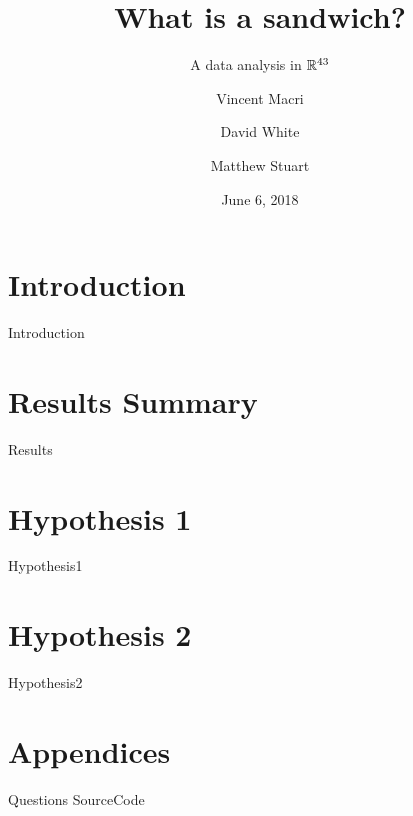 

\title{What is a sandwich?}
\subtitle{A data analysis in $\mathbb{R}^{43}$}
\author{Vincent Macri \and David White \and Matthew Stuart}
\date{June 6, 2018}


	\maketitle
	
	\tableofcontents
	\clearpage
	\part{Introduction}\label{part:introduction}
		{Introduction}
	\part{Results Summary}\label{part:results}
		{Results}
	\part{Hypothesis 1}\label{part:hypothesis1}
		{Hypothesis1}
	\part{Hypothesis 2}\label{part:hypothesis2}
		{Hypothesis2}
	\appendix
	\part{Appendices}\label{part:appendix}
		{Questions}
		{SourceCode}
	\nocite{*}
	\printbibliography

